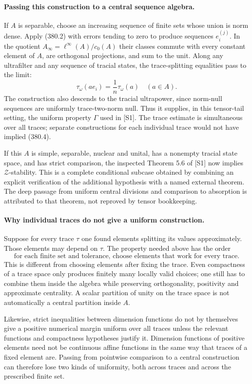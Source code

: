 \documentclass[11pt]{article}
\begin{document}
\paragraph{Passing this construction to a central sequence algebra.}
If $A$ is separable, choose an increasing sequence of finite sets
whose union is norm dense. Apply (380.2) with errors tending to
zero to produce sequences $e_i^{(j)}$. In the quotient
$A_\infty=\ell^\infty(A)/c_0(A)$ their classes commute with every
constant element of $A$, are orthogonal projections, and sum to
the unit. Along any ultrafilter and any sequence of tracial states,
the trace-splitting equalities pass to the limit:
\[
 \tau_\omega(ae_i)=\frac1n\tau_\omega(a)
                         \quad(a\in A).
 \tag{380.4}
\]
The construction also descends to the tracial ultrapower, since
norm-null sequences are uniformly trace-two-norm null. Thus it
supplies, in this tensor-tail setting, the uniform property
$\Gamma$ used in [S1]. The trace estimate is simultaneous over
all traces; separate constructions for each individual trace
would not have implied (380.4).

If this $A$ is simple, separable, nuclear and unital, has a
nonempty tracial state space, and has strict comparison, the
inspected Theorem 5.6 of [S1] now implies $\mathcal Z$-stability.
This is a complete conditional subcase obtained by combining an
explicit verification of the additional hypothesis with a named
external theorem. The deep passage from uniform central
divisions and comparison to absorption is attributed to that
theorem, not reproved by tensor bookkeeping.

\paragraph{Why individual traces do not give a uniform construction.}
Suppose for every trace $\tau$ one found elements splitting its
values approximately. Those elements may depend on $\tau$.
The property needed above has the order
\[
 \text{for each finite set and tolerance, choose elements that
 work for every trace.}
\]
This is different from choosing elements after fixing the trace.
Even compactness of a trace space only produces finitely many
locally valid choices; one still has to combine them inside the
algebra while preserving orthogonality, positivity and approximate
centrality. A scalar partition of unity on the trace space is
not automatically a central partition inside $A$.

Likewise, strict inequalities between dimension functions do not
by themselves give a positive numerical margin uniform over all
traces unless the relevant functions and compactness hypotheses
justify it. Dimension functions of positive elements need not
be continuous affine functions in the same way that traces of a
fixed element are. Passing from pointwise comparison to a
central construction can therefore lose two kinds of uniformity,
both across traces and across the prescribed finite set.
\end{document}
